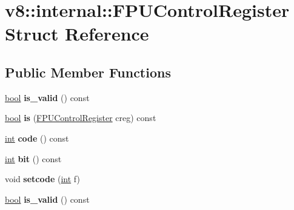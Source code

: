 \hypertarget{structv8_1_1internal_1_1FPUControlRegister}{}\section{v8\+:\+:internal\+:\+:F\+P\+U\+Control\+Register Struct Reference}
\label{structv8_1_1internal_1_1FPUControlRegister}
\subsection*{Public Member Functions}
\begin{DoxyCompactItemize}
\item 
\mbox{\label{structv8_1_1internal_1_1FPUControlRegister_aad867e5bad35c071b9393372afb6b4a8}} 
\mbox{\hyperlink{classbool}{bool}} {\bfseries is\+\_\+valid} () const
\item 
\mbox{\label{structv8_1_1internal_1_1FPUControlRegister_a55d84f34424cd8465a427ee79f1be26e}} 
\mbox{\hyperlink{classbool}{bool}} {\bfseries is} (\mbox{\hyperlink{structv8_1_1internal_1_1FPUControlRegister}{F\+P\+U\+Control\+Register}} creg) const
\item 
\mbox{\label{structv8_1_1internal_1_1FPUControlRegister_a4ad75fa5a8bf43d84eb6c304abef9030}} 
\mbox{\hyperlink{classint}{int}} {\bfseries code} () const
\item 
\mbox{\label{structv8_1_1internal_1_1FPUControlRegister_a03c6c4bad593ad8f1f9c473267fa9789}} 
\mbox{\hyperlink{classint}{int}} {\bfseries bit} () const
\item 
\mbox{\label{structv8_1_1internal_1_1FPUControlRegister_a6f06c7ced9e245e228cc87cd9549984a}} 
void {\bfseries setcode} (\mbox{\hyperlink{classint}{int}} f)
\item 
\mbox{\label{structv8_1_1internal_1_1FPUControlRegister_aad867e5bad35c071b9393372afb6b4a8}} 
\mbox{\hyperlink{classbool}{bool}} {\bfseries is\+\_\+valid} () const
\item 

\end{DoxyCompactItemize}
